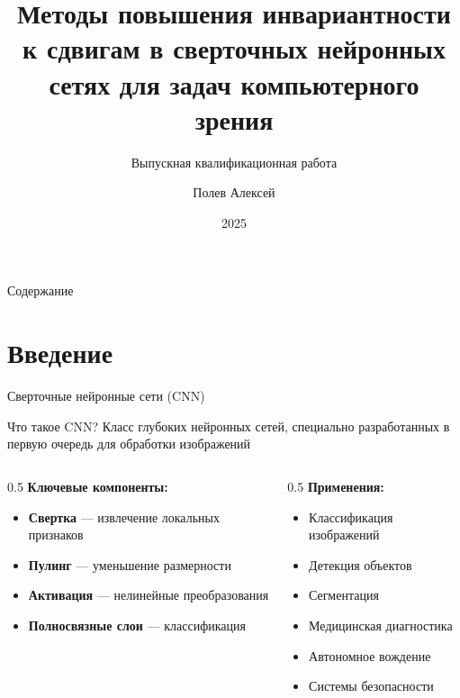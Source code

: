 \documentclass[aspectratio=169]{beamer}
\title[Инвариантность к сдвигам в CNN]{Методы повышения инвариантности к сдвигам в сверточных нейронных сетях для задач компьютерного зрения}
\subtitle{Выпускная квалификационная работа}
\author{Полев Алексей}
\institute[МФТИ]{Московский физико-технический институт}
\date{2025}
\begin{document}
\begin{frame}
    \titlepage
\end{frame}

\begin{frame}{Содержание}
    \tableofcontents
\end{frame}

\section{Введение}

\begin{frame}{Сверточные нейронные сети (CNN)}
    \begin{block}{Что такое CNN?}
        Класс глубоких нейронных сетей, специально разработанных в первую очередь для обработки изображений
    \end{block}
    
    \begin{columns}
        \begin{column}{0.5\textwidth}
            \textbf{Ключевые компоненты:}
            \begin{itemize}
                \item \textbf{Свертка} — извлечение локальных признаков
                \item \textbf{Пулинг} — уменьшение размерности
                \item \textbf{Активация} — нелинейные преобразования
                \item \textbf{Полносвязные слои} — классификация
            \end{itemize}
        \end{column}
        \begin{column}{0.5\textwidth}
            \textbf{Применения:}
            \begin{itemize}
                \item Классификация изображений
                \item Детекция объектов
                \item Сегментация
                \item Медицинская диагностика
                \item Автономное вождение
                \item Системы безопасности
            \end{itemize}
        \end{column}
    \end{columns}
    

\end{frame}
\end{document}
